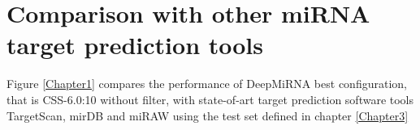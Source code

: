 \section{Comparison with other miRNA target prediction tools}
Figure \ref{Chapter1} compares the performance of DeepMiRNA best configuration, that is CSS-6.0:10 without filter, with state-of-art target prediction software tools TargetScan, mirDB and miRAW using the test set defined in chapter \ref{Chapter3} 